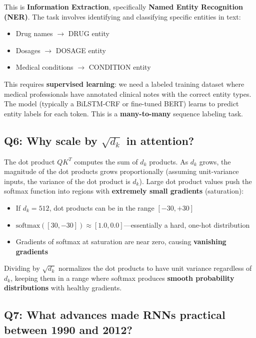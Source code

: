 \documentclass[11pt,a4paper]{article}
\begin{document}
This is \textbf{Information Extraction}, specifically \textbf{Named Entity Recognition (NER)}. The task involves identifying and classifying specific entities in text:

\begin{itemize}[leftmargin=1.5em]
    \item Drug names $\to$ DRUG entity
    \item Dosages $\to$ DOSAGE entity
    \item Medical conditions $\to$ CONDITION entity
\end{itemize}

This requires \textbf{supervised learning}: we need a labeled training dataset where medical professionals have annotated clinical notes with the correct entity types. The model (typically a BiLSTM-CRF or fine-tuned BERT) learns to predict entity labels for each token. This is a \textbf{many-to-many} sequence labeling task.

\subsection*{Q6: Why scale by $\sqrt{d_k}$ in attention?}

The dot product $QK^T$ computes the sum of $d_k$ products. As $d_k$ grows, the magnitude of the dot products grows proportionally (assuming unit-variance inputs, the variance of the dot product is $d_k$). Large dot product values push the softmax function into regions with \textbf{extremely small gradients} (saturation):

\begin{itemize}[leftmargin=1.5em]
    \item If $d_k = 512$, dot products can be in the range $[-30, +30]$
    \item $\text{softmax}([30, -30]) \approx [1.0, 0.0]$---essentially a hard, one-hot distribution
    \item Gradients of softmax at saturation are near zero, causing \textbf{vanishing gradients}
\end{itemize}

Dividing by $\sqrt{d_k}$ normalizes the dot products to have unit variance regardless of $d_k$, keeping them in a range where softmax produces \textbf{smooth probability distributions} with healthy gradients.

\subsection*{Q7: What advances made RNNs practical between 1990 and 2012?}
\end{document}

